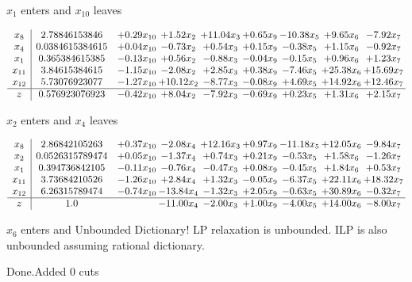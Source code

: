 \documentclass[8pt]{article}
\begin{document}
 $ x_{1} $ enters and $ x_{10} $ leaves 

 \[\begin{array}{c| c c@{\hskip 2pt} c@{\hskip 2pt} c@{\hskip 2pt} c@{\hskip 2pt} c@{\hskip 2pt} c@{\hskip 2pt} c@{\hskip 2pt} }
 x_{8}   &  2.78846153846 & +  0.29 x_{10} & +  1.52 x_{2} & + 11.04 x_{3} & +  0.65 x_{9} & -10.38 x_{5} & +  9.65 x_{6} & -7.92 x_{7}\\
 x_{4}   &  0.0384615384615 & +  0.04 x_{10} & -0.73 x_{2} & +  0.54 x_{3} & +  0.15 x_{9} & -0.38 x_{5} & +  1.15 x_{6} & -0.92 x_{7}\\
 x_{1}   &  0.365384615385 & -0.13 x_{10} & +  0.56 x_{2} & -0.88 x_{3} & -0.04 x_{9} & -0.15 x_{5} & +  0.96 x_{6} & +  1.23 x_{7}\\
 x_{11}   &  3.84615384615 & -1.15 x_{10} & -2.08 x_{2} & +  2.85 x_{3} & +  0.38 x_{9} & -7.46 x_{5} & + 25.38 x_{6} & + 15.69 x_{7}\\
 x_{12}   &  5.73076923077 & -1.27 x_{10} & + 10.12 x_{2} & -8.77 x_{3} & -0.08 x_{9} & +  4.69 x_{5} & + 14.92 x_{6} & + 12.46 x_{7}\\
\hline
z    &  0.576923076923 & -0.42 x_{10} & +  8.04 x_{2} & -7.92 x_{3} & -0.69 x_{9} & +  0.23 x_{5} & +  1.31 x_{6} & +  2.15 x_{7}\\
\end{array}\]


 $ x_{2} $ enters and $ x_{4} $ leaves 

 \[\begin{array}{c| c c@{\hskip 2pt} c@{\hskip 2pt} c@{\hskip 2pt} c@{\hskip 2pt} c@{\hskip 2pt} c@{\hskip 2pt} c@{\hskip 2pt} }
 x_{8}   &  2.86842105263 & +  0.37 x_{10} & -2.08 x_{4} & + 12.16 x_{3} & +  0.97 x_{9} & -11.18 x_{5} & + 12.05 x_{6} & -9.84 x_{7}\\
 x_{2}   &  0.0526315789474 & +  0.05 x_{10} & -1.37 x_{4} & +  0.74 x_{3} & +  0.21 x_{9} & -0.53 x_{5} & +  1.58 x_{6} & -1.26 x_{7}\\
 x_{1}   &  0.394736842105 & -0.11 x_{10} & -0.76 x_{4} & -0.47 x_{3} & +  0.08 x_{9} & -0.45 x_{5} & +  1.84 x_{6} & +  0.53 x_{7}\\
 x_{11}   &  3.73684210526 & -1.26 x_{10} & +  2.84 x_{4} & +  1.32 x_{3} & -0.05 x_{9} & -6.37 x_{5} & + 22.11 x_{6} & + 18.32 x_{7}\\
 x_{12}   &  6.26315789474 & -0.74 x_{10} & -13.84 x_{4} & -1.32 x_{3} & +  2.05 x_{9} & -0.63 x_{5} & + 30.89 x_{6} & -0.32 x_{7}\\
\hline
z    &  1.0  &   & -11.00 x_{4} & -2.00 x_{3} & +  1.00 x_{9} & -4.00 x_{5} & + 14.00 x_{6} & -8.00 x_{7}\\
\end{array}\]


 $ x_{6} $ enters and Unbounded Dictionary!
 LP relaxation is unbounded. ILP is also unbounded assuming rational dictionary. 

Done.Added 0 cuts 
\end{document}
